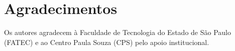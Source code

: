 \documentclass[11pt,a4paper]{article}
\begin{document}
\section*{Agradecimentos}

Os autores agradecem à Faculdade de Tecnologia do Estado de São Paulo (FATEC) e ao Centro Paula Souza (CPS) pelo apoio institucional.



\end{document}
